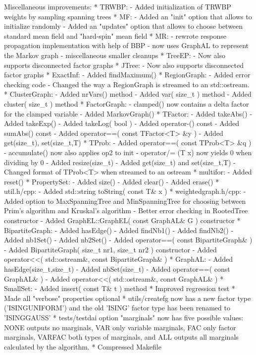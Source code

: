 \begin{DoxyVerbInclude}
Miscellaneous improvements:
* TRWBP:
  - Added initialization of TRWBP weights by sampling spanning trees
* MF:
  - Added an "init" option that allows to initialize randomly
  - Added an "updates" option that allows to choose between standard
    mean field and "hard-spin" mean field
* MR:
  - rewrote response propagation implementation with help of BBP
  - now uses GraphAL to represent the Markov graph
  - miscellaneous smaller cleanups
* TreeEP:
  - Now also supports disconnected factor graphs
* JTree:
  - Now also supports disconnected factor graphs
* ExactInf:
  - Added findMaximum()
* RegionGraph:
  - Added error checking code
  - Changed the way a RegionGraph is streamed to an std::ostream.
* ClusterGraph:
  - Added nrVars() method
  - Added var( size_t ) method
  - Added cluster( size_t ) method
* FactorGraph:
  - clamped() now contains a delta factor for the clamped variable
  - Added MarkovGraph()
* TFactor:
  - Added takeAbs()
  - Added takeExp()
  - Added takeLog( bool )
  - Added operator-() const
  - Added sumAbs() const
  - Added operator==( const TFactor<T> &y )
  - Added get(size_t), set(size_t,T)
* TProb:
  - Added operator==( const TProb<T> &q )
  - accumulate() now also applies op2 to init
  - operator/= (T x) now yields 0 when dividing by 0
  - Added resize(size_t)
  - Added get(size_t) and set(size_t,T) 
  - Changed format of TProb<T> when streamed to an ostream
* multifor:
  - Added reset()
* PropertySet:
  - Added size()
  - Added clear()
  - Added erase()
* util.h/cpp:
  - Added std::string toString( const T& x )
* weightedgraph.h/cpp:
  - Added option to MaxSpanningTree and MinSpanningTree for
    choosing between Prim's algorithm and Kruskal's algorithm
  - Better error checking in RootedTree constructor
  - Added GraphEL::GraphEL( const GraphAL& G ) constructor
* BipartiteGraph:
  - Added hasEdge()
  - Added findNb1()
  - Added findNb2()
  - Added nb1Set()
  - Added nb2Set()
  - Added operator==( const BipartiteGraph& )
  - Added BipartiteGraph( size_t nr1, size_t nr2 ) constructor
  - Added operator<<( std::ostream&, const BipartiteGraph& )
* GraphAL:
  - Added hasEdge(size_t,size_t)
  - Added nbSet(size_t)
  - Added operator==( const GraphAL& )
  - Added operator<<( std::ostream&, const GraphAL& )
* SmallSet:
  - Added insert( const T& t ) method
* Improved regression test
* Made all "verbose" properties optional
* utils/createfg now has a new factor type ('ISINGUNIFORM') and the old
  'ISING' factor type has been renamed to 'ISINGGAUSS'
* tests/testdai option "marginals" now has five possible values: NONE
  outputs no marginals, VAR only variable marginals, FAC only factor
  marginals, VARFAC both types of marginals, and ALL outputs all
  marginals calculated by the algorithm.
* Compressed Makefile


\end{DoxyVerbInclude}
